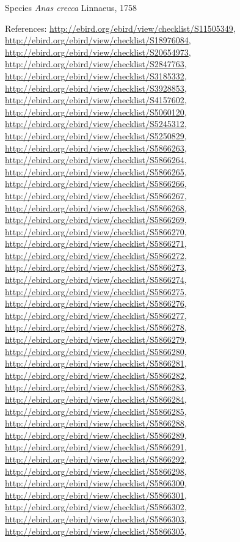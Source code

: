 \documentclass[9pt, article]{memoir}
\begin{document}
\begin{multicols}{2}
\vspace{6pt}\noindent\hspace{36pt}Species \textit{Anas crecca} Linnaeus, 1758


\vspace{6pt}References: 
\url{http://ebird.org/ebird/view/checklist/S11505349}, 
\url{http://ebird.org/ebird/view/checklist/S18976084}, 
\url{http://ebird.org/ebird/view/checklist/S20654973}, 
\url{http://ebird.org/ebird/view/checklist/S2847763}, 
\url{http://ebird.org/ebird/view/checklist/S3185332}, 
\url{http://ebird.org/ebird/view/checklist/S3928853}, 
\url{http://ebird.org/ebird/view/checklist/S4157602}, 
\url{http://ebird.org/ebird/view/checklist/S5060120}, 
\url{http://ebird.org/ebird/view/checklist/S5245312}, 
\url{http://ebird.org/ebird/view/checklist/S5250829}, 
\url{http://ebird.org/ebird/view/checklist/S5866263}, 
\url{http://ebird.org/ebird/view/checklist/S5866264}, 
\url{http://ebird.org/ebird/view/checklist/S5866265}, 
\url{http://ebird.org/ebird/view/checklist/S5866266}, 
\url{http://ebird.org/ebird/view/checklist/S5866267}, 
\url{http://ebird.org/ebird/view/checklist/S5866268}, 
\url{http://ebird.org/ebird/view/checklist/S5866269}, 
\url{http://ebird.org/ebird/view/checklist/S5866270}, 
\url{http://ebird.org/ebird/view/checklist/S5866271}, 
\url{http://ebird.org/ebird/view/checklist/S5866272}, 
\url{http://ebird.org/ebird/view/checklist/S5866273}, 
\url{http://ebird.org/ebird/view/checklist/S5866274}, 
\url{http://ebird.org/ebird/view/checklist/S5866275}, 
\url{http://ebird.org/ebird/view/checklist/S5866276}, 
\url{http://ebird.org/ebird/view/checklist/S5866277}, 
\url{http://ebird.org/ebird/view/checklist/S5866278}, 
\url{http://ebird.org/ebird/view/checklist/S5866279}, 
\url{http://ebird.org/ebird/view/checklist/S5866280}, 
\url{http://ebird.org/ebird/view/checklist/S5866281}, 
\url{http://ebird.org/ebird/view/checklist/S5866282}, 
\url{http://ebird.org/ebird/view/checklist/S5866283}, 
\url{http://ebird.org/ebird/view/checklist/S5866284}, 
\url{http://ebird.org/ebird/view/checklist/S5866285}, 
\url{http://ebird.org/ebird/view/checklist/S5866288}, 
\url{http://ebird.org/ebird/view/checklist/S5866289}, 
\url{http://ebird.org/ebird/view/checklist/S5866291}, 
\url{http://ebird.org/ebird/view/checklist/S5866292}, 
\url{http://ebird.org/ebird/view/checklist/S5866298}, 
\url{http://ebird.org/ebird/view/checklist/S5866300}, 
\url{http://ebird.org/ebird/view/checklist/S5866301}, 
\url{http://ebird.org/ebird/view/checklist/S5866302}, 
\url{http://ebird.org/ebird/view/checklist/S5866303}, 
\url{http://ebird.org/ebird/view/checklist/S5866305}, 

\end{multicols}
\end{document}
